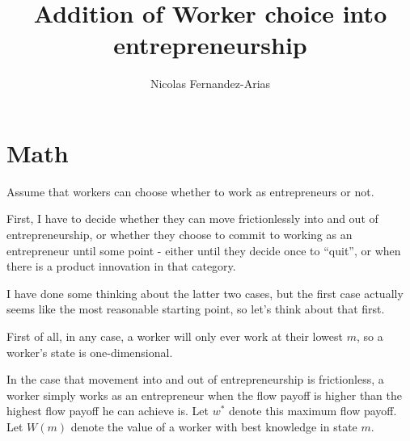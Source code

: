 \documentclass[12pt,english]{article}
\theoremstyle{remark}
\begin{document}
	
\title{Addition of Worker choice into entrepreneurship}
\author{Nicolas Fernandez-Arias}
\maketitle

\section{Math}

Assume that workers can choose whether to work as entrepreneurs or not. 

First, I have to decide whether they can move frictionlessly into and out of entrepreneurship, or whether they choose to commit to working as an entrepreneur until some point - either until they decide once to ``quit'', or when there is a product innovation in that category.

I have done some thinking about the latter two cases, but the first case actually seems like the most reasonable starting point, so let's think about that first. 

First of all, in any case, a worker will only ever work at their lowest $m$, so a worker's state is one-dimensional. 

In the case that movement into and out of entrepreneurship is frictionless, a worker simply works as an entrepreneur when the flow payoff is higher than the highest flow payoff he can achieve is. Let $w^*$ denote this maximum flow payoff. Let $W(m)$ denote the value of a worker with best knowledge in state $m$. 
\end{document}
